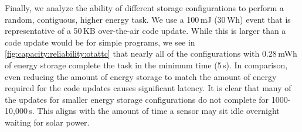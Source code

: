 
Finally, we analyze the ability of different storage configurations to perform a
random, contiguous, higher energy task. We use a 100\,mJ (30\,\textmu Wh) event that is representative of a
50\,KB over-the-air code update. While this is larger than a code update would be
for simple programs,
we see in \cref{fig:capacity:reliability:otattc} that nearly all of the configurations with
0.28\,mWh of energy storage complete the task in the minimum time (5\,s). In comparison,
even reducing the amount of energy storage to match the amount of energy
required for the code updates causes significant latency. It is clear that
many of the updates for smaller energy storage configurations
do not complete for 1000-10,000\,s.
This aligns with the amount of time a sensor may sit
idle overnight waiting for solar power.

